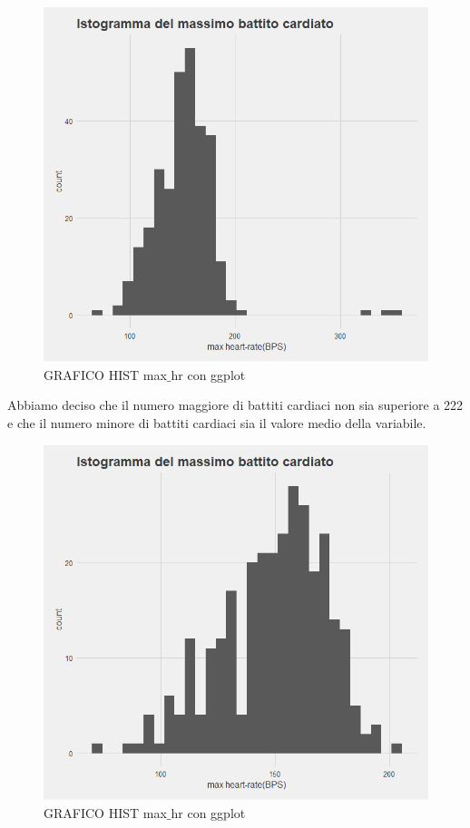 \documentclass{article}
\begin{document}
\begin{figure}[h]
	\centering
	\includegraphics[width=1\textwidth]{max_hr_before.png}
	\caption{GRAFICO HIST max$\_$hr con ggplot}
	\label {fig:ds1}
\end{figure}

Abbiamo deciso che il numero maggiore di battiti cardiaci non sia superiore a 222 e che il numero minore di battiti cardiaci sia il valore medio della variabile. 



\begin{figure}[h]
	\centering
	\includegraphics[width=1\textwidth]{max_hr_after.png}
	\caption{GRAFICO HIST max$\_$hr con ggplot}
	\label {fig:ds1}
\end{figure}
\end{document}
